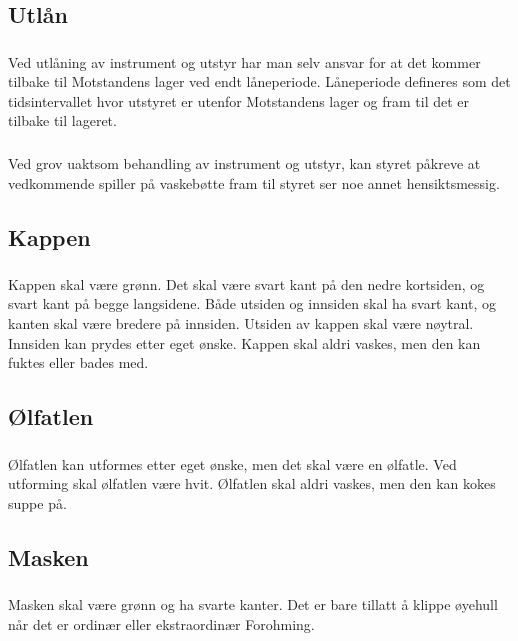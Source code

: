 \documentclass{article}
\newenvironment{statute}[1][]
    {
        \titleformat{\subsubsection}[runin]{\normalfont}{\hspace{1pt}\textit{\S\hspace{5pt}\thesubsubsection}}{0pt}{\rule{4pt}{0pt}}{}
        \subsubsection{}#1
        \begin{minipage}[t]{0.9\linewidth}
    }
    {
        \end{minipage}
        
        \ignorespacesafterend
    }
\begin{document}
        \subsection{Utlån}
                \begin{statute}
                    Ved utlåning av instrument og utstyr har man selv ansvar for at det kommer tilbake til Motstandens lager ved endt låneperiode. Låneperiode defineres som det tidsintervallet hvor utstyret er utenfor Motstandens lager og fram til det er tilbake til lageret.
                \end{statute}
                \begin{statute}
                    Ved grov uaktsom behandling av instrument og utstyr, kan styret påkreve at vedkommende spiller på vaskebøtte fram til styret ser noe annet hensiktsmessig. 
                \end{statute}

            
        \subsection{Kappen}
                \begin{statute}
                    Kappen skal være grønn. Det skal være svart kant på den nedre kortsiden, og svart kant på begge langsidene. Både utsiden og innsiden skal ha svart kant, og kanten skal være bredere på innsiden. Utsiden av kappen skal være nøytral. Innsiden kan prydes etter eget ønske. Kappen skal aldri vaskes, men den kan fuktes eller bades med.
                \end{statute}

        \subsection{Ølfatlen}
            \begin{statute}
                Ølfatlen kan utformes etter eget ønske, men det skal være en ølfatle. Ved utforming skal ølfatlen være hvit. Ølfatlen skal aldri vaskes, men den kan kokes suppe på.
            \end{statute}
            
        \subsection{Masken}
            \begin{statute}
                Masken skal være grønn og ha svarte kanter. Det er bare tillatt å klippe øyehull når det er ordinær eller ekstraordinær Forohming.
            \end{statute}
           
\end{document}
